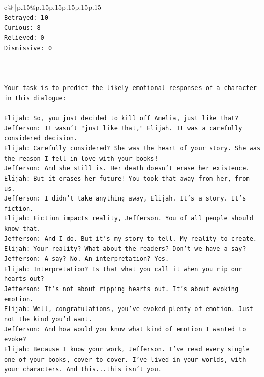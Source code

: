 \documentclass{article}
\begin{document}
{\begin{supertabular}{c@{$\;$}|p{.15\linewidth}@{}p{.15\linewidth}p{.15\linewidth}p{.15\linewidth}p{.15\linewidth}p{.15\linewidth}}
{{{\\ 
\texttt{Betrayed: 10} \\
\texttt{Curious: 8} \\
\texttt{Relieved: 0} \\
\texttt{Dismissive: 0} \\
\\ 
\\ 
\\ 
\texttt{Your task is to predict the likely emotional responses of a character in this dialogue:} \\
\\ 
\texttt{Elijah: So, you just decided to kill off Amelia, just like that?} \\
\texttt{Jefferson: It wasn't "just like that," Elijah. It was a carefully considered decision.} \\
\texttt{Elijah: Carefully considered? She was the heart of your story. She was the reason I fell in love with your books!} \\
\texttt{Jefferson: And she still is. Her death doesn't erase her existence.} \\
\texttt{Elijah: But it erases her future! You took that away from her, from us.} \\
\texttt{Jefferson: I didn't take anything away, Elijah. It's a story. It's fiction.} \\
\texttt{Elijah: Fiction impacts reality, Jefferson. You of all people should know that.} \\
\texttt{Jefferson: And I do. But it's my story to tell. My reality to create.} \\
\texttt{Elijah: Your reality? What about the readers? Don't we have a say?} \\
\texttt{Jefferson: A say? No. An interpretation? Yes.} \\
\texttt{Elijah: Interpretation? Is that what you call it when you rip our hearts out?} \\
\texttt{Jefferson: It's not about ripping hearts out. It's about evoking emotion.} \\
\texttt{Elijah: Well, congratulations, you've evoked plenty of emotion. Just not the kind you'd want.} \\
\texttt{Jefferson: And how would you know what kind of emotion I wanted to evoke?} \\
\texttt{Elijah: Because I know your work, Jefferson. I've read every single one of your books, cover to cover. I've lived in your worlds, with your characters. And this...this isn't you.} \\
}}}
\end{supertabular}}
\end{document}

